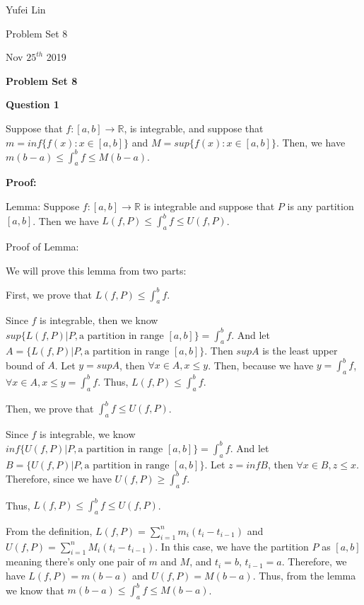 \documentclass[a4paper,12pt]{report}
\begin{document}
\noindent
Yufei Lin

\noindent
Problem Set 8

\noindent
Nov \(25^{th}\) 2019

\begin{center}
\textbf{Problem Set 8}
\end{center}

\noindent
\textbf{Question 1}

\noindent
Suppose that $f:[a,b]\rightarrow\mathbb{R}$, is integrable, and suppose that $m=inf\{f(x):x\in [a,b]\}$ and $M=sup\{f(x):x\in [a,b]\}$. Then, we have $m(b-a)\leq \int_{a}^{b}f\leq M(b-a)$.

\noindent
\textbf{Proof: }

\noindent
Lemma: Suppose $f:[a,b]\rightarrow\mathbb{R}$ is integrable and suppose that $P$ is any partition $[a,b]$. Then we have $L(f,P)\leq \int_{a}^{b}f\leq U(f,P)$.

\noindent
Proof of Lemma:

\noindent
We will prove this lemma from two parts:

\noindent
First, we prove that $L(f,P)\leq \int_{a}^{b}f$.

\noindent
Since $f$ is integrable, then we know $sup\{L(f,P)|P, \text{a partition in range }[a,b]\}=\int_{a}^{b}f$. And let $A=\{L(f,P)|P, \text{a partition in range }[a,b]\}$. Then $supA$ is the least upper bound of $A$. Let $y=supA$, then $\forall x \in A, x\leq y$. Then, because we have $y=\int_{a}^{b}f$, $\forall x\in A, x\leq y=\int_{a}^{b}f$. Thus, $L(f,P)\leq \int_{a}^{b}f$. 

\noindent
Then, we prove that $\int_{a}^{b}f\leq U(f,P)$. 

\noindent
Since $f$ is integrable, we know $inf\{U(f,P)|P, \text{a partition in range }[a,b]\}=\int_{a}^{b}f$. And let $B=\{U(f,P)|P, \text{a partition in range }[a,b]\}$. Let $z=infB$, then $\forall x\in B, z\leq x$. Therefore, since we have $U(f,P)\geq \int_{a}^{b}f$. 

\noindent
Thus, $L(f,P)\leq \int_{a}^{b}f\leq U(f,P)$.

\noindent
From the definition, $L(f,P)=\sum_{i=1}^{n}m_i(t_i-t_{i-1})$ and $U(f,P)=\sum_{i=1}^{n}M_i(t_i-t_{i-1})$. In this case, we have the partition $P$ as $[a,b]$ meaning there's only one pair of $m$ and $M$, and $t_i = b$, $t_{i-1}=a$. Therefore, we have $L(f,P)=m(b-a)$ and $U(f,P)=M(b-a)$. Thus, from the lemma we know that $m(b-a)\leq \int_{a}^{b}f\leq M(b-a)$. \\
\end{document}
